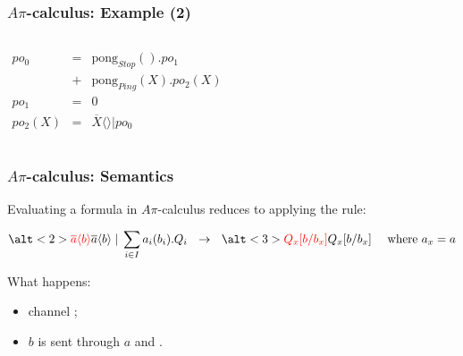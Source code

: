 \documentclass{beamer}
\begin{document}
\begin{frame}
\frametitle{$A\pi$-calculus: Example (2)}
\begin{columns}

\column{5cm}
\begin{eqnarray*}
po_0    & = & \text{pong}_{Stop}().po_1 \\
        & + & \text{pong}_{Ping}(X).po_2(X)\\
po_1    & = & 0 \\
po_2(X)    & = & \overline{X}\langle \rangle | po_0
\end{eqnarray*}

\column{5cm}
\begin{figure}
\end{figure}
\end{columns}
\end{frame}

\begin{frame}
\frametitle{$A\pi$-calculus: Semantics}
Evaluating a formula in $A\pi$-calculus reduces to applying the rule:


\begin{equation*}
\alt<2>{\textcolor{red}{\overline{a}\langle b \rangle}}{\overline{a}\langle b \rangle} \;|\; \sum_{i \in I} a_i(b_i).Q_i
~~ \rightarrow ~~
\alt<3>{\textcolor{red}{Q_x[b/b_x]}}{Q_x[b/b_x]}
~~~~ \text{where $a_x = a$}
\end{equation*}

\vspace{10pt}

What happens:
\begin{itemize}
\item channel ;
\item $b$ is sent through $a$ and .
\end{itemize}
\end{frame}
\end{document}
